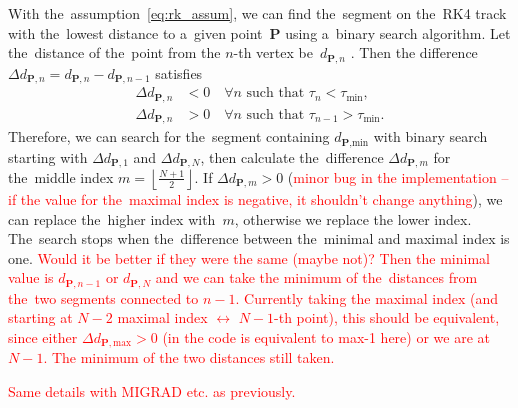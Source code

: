 		With the~assumption~\ref{eq:rk_assum}, we can find the~segment on the~\ac{RK4} track with the~lowest distance to a~given point~$\mathbf{P}$ using a~binary search algorithm. Let the~distance of the~point from the $n$\nobreakdash-th vertex %
		be~$d_{\mathbf{P},n}$%
		. Then the difference $\Delta d_{\mathbf{P},n} = d_{\mathbf{P},n}-d_{\mathbf{P},n-1}$ satisfies
			\begin{equation}
				\begin{aligned}
					\Delta d_{\mathbf{P},n} &< 0\quad \forall n \text{ such that } \tau_n < \tau_\text{min},\\
					\Delta d_{\mathbf{P},n} &> 0\quad \forall n \text{ such that } \tau_{n-1} > \tau_\text{min}.
				\end{aligned}
			\end{equation}
		Therefore, we can search for the~segment containing $d_{\textbf{P},\text{min}}$ with binary search starting with $\Delta d_{\mathbf{P},1}$ and $\Delta d_{\mathbf{P},N}$, then calculate the~difference $\Delta d_{\mathbf{P},m}$ for the~middle index $m = \left\lfloor\frac{N+1}{2}\right\rfloor$. If $\Delta d_{\mathbf{P},m} > 0$ (\textcolor{red}{minor bug in the implementation -- if the value for the~maximal index is negative, it shouldn't change anything}), we can replace the~higher index with~$m$, otherwise we replace the lower index. The~search stops when the~difference between the~minimal and maximal index is one. \textcolor{red}{Would it be better if they were the same (maybe not)? Then the minimal value is $d_{\mathbf{P},n-1}$ or $d_{\mathbf{P},N}$ and we can take the minimum of the~distances from the~two segments connected to $n-1$. Currently taking the maximal index (and starting at $N-2$ maximal index $\leftrightarrow$ $N-1$\nobreakdash-th point), this should be equivalent, since either $\Delta d_{\mathbf{P},\text{max}} > 0$ (in the code is equivalent to max-1 here) or we are at $N-1$. The minimum of the two distances still taken.}
		
		\textcolor{red}{Same details with MIGRAD etc. as previously.}